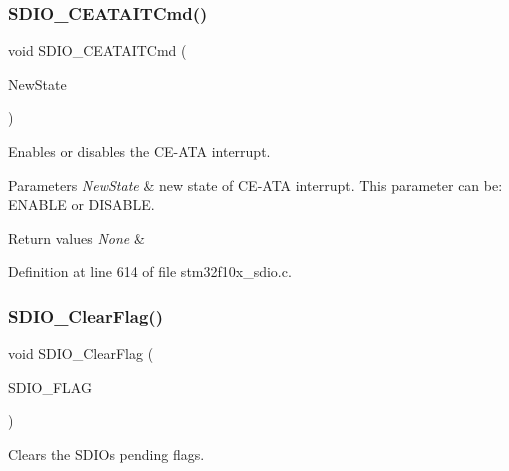 \subsubsection{\texorpdfstring{S\+D\+I\+O\+\_\+\+C\+E\+A\+T\+A\+I\+T\+Cmd()}{SDIO\_CEATAITCmd()}}
{\footnotesize\ttfamily void S\+D\+I\+O\+\_\+\+C\+E\+A\+T\+A\+I\+T\+Cmd (\begin{DoxyParamCaption}\item[{\hyperlink{group___exported__types_gac9a7e9a35d2513ec15c3b537aaa4fba1}{Functional\+State}}]{New\+State }\end{DoxyParamCaption})}



Enables or disables the C\+E-\/\+A\+TA interrupt. 


\begin{DoxyParams}{Parameters}
{\em New\+State} & new state of C\+E-\/\+A\+TA interrupt. This parameter can be\+: E\+N\+A\+B\+LE or D\+I\+S\+A\+B\+LE. \\
\hline
\end{DoxyParams}

\begin{DoxyRetVals}{Return values}
{\em None} & \\
\hline
\end{DoxyRetVals}


Definition at line 614 of file stm32f10x\+\_\+sdio.\+c.

\mbox{\label{group___s_d_i_o___exported___functions_ga7aff4efdeb528229135f9f285e53518a}} 
\subsubsection{\texorpdfstring{S\+D\+I\+O\+\_\+\+Clear\+Flag()}{SDIO\_ClearFlag()}}
{\footnotesize\ttfamily void S\+D\+I\+O\+\_\+\+Clear\+Flag (\begin{DoxyParamCaption}\item[{uint32\+\_\+t}]{S\+D\+I\+O\+\_\+\+F\+L\+AG }\end{DoxyParamCaption})}



Clears the S\+D\+IO\textquotesingle{}s pending flags. 


